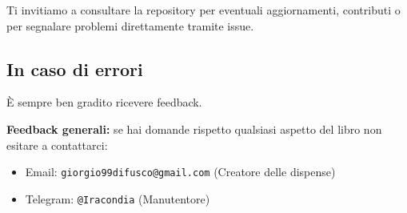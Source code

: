 Ti invitiamo a consultare la repository per eventuali aggiornamenti, contributi o per segnalare problemi direttamente tramite issue.

\subsection{In caso di errori}
È sempre ben gradito ricevere feedback.

\textbf{Feedback generali:} se hai domande rispetto qualsiasi aspetto del libro non esitare a contattarci:
\begin{itemize}
	\item Email: \texttt{giorgio99difusco@gmail.com} (Creatore delle dispense)
	\item Telegram: \texttt{@Iracondia} (Manutentore)
\end{itemize}
